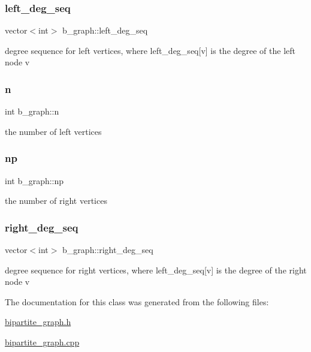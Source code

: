 \subsubsection{\texorpdfstring{left\+\_\+deg\+\_\+seq}{left\_deg\_seq}}
{\footnotesize\ttfamily vector$<$int$>$ b\+\_\+graph\+::left\+\_\+deg\+\_\+seq\hspace{0.3cm}{\ttfamily [private]}}



degree sequence for left vertices, where left\+\_\+deg\+\_\+seq\mbox{[}v\mbox{]} is the degree of the left node v 

\mbox{\label{classb__graph_a9e211d40c1799bc9b125de472ff06642}} 
\subsubsection{\texorpdfstring{n}{n}}
{\footnotesize\ttfamily int b\+\_\+graph\+::n\hspace{0.3cm}{\ttfamily [private]}}



the number of left vertices 

\mbox{\label{classb__graph_acffdd5f20329515eb6ec17ad24f1ca64}} 
\subsubsection{\texorpdfstring{np}{np}}
{\footnotesize\ttfamily int b\+\_\+graph\+::np\hspace{0.3cm}{\ttfamily [private]}}



the number of right vertices 

\mbox{\label{classb__graph_ae4c875ed6a583a78f38dfe958f20fad5}} 
\subsubsection{\texorpdfstring{right\+\_\+deg\+\_\+seq}{right\_deg\_seq}}
{\footnotesize\ttfamily vector$<$int$>$ b\+\_\+graph\+::right\+\_\+deg\+\_\+seq\hspace{0.3cm}{\ttfamily [private]}}



degree sequence for right vertices, where left\+\_\+deg\+\_\+seq\mbox{[}v\mbox{]} is the degree of the right node v 



The documentation for this class was generated from the following files\+:\begin{DoxyCompactItemize}
\item 
\hyperlink{bipartite__graph_8h}{bipartite\+\_\+graph.\+h}\item 
\hyperlink{bipartite__graph_8cpp}{bipartite\+\_\+graph.\+cpp}\end{DoxyCompactItemize}
